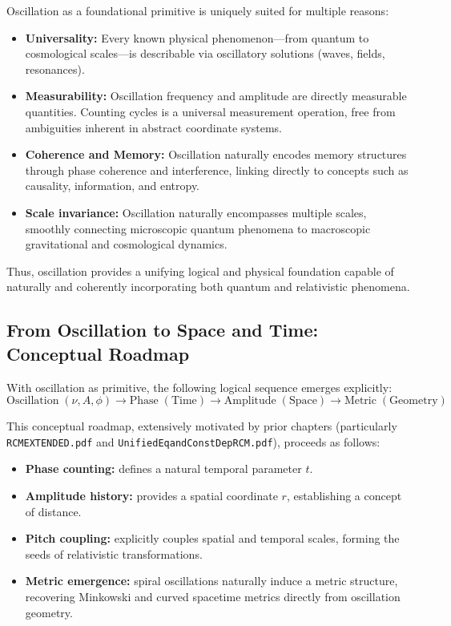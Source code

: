 Oscillation as a foundational primitive is uniquely suited for multiple reasons:
\begin{itemize}
    \item \textbf{Universality:} Every known physical phenomenon—from quantum to cosmological scales—is describable via oscillatory solutions (waves, fields, resonances).
    \item \textbf{Measurability:} Oscillation frequency and amplitude are directly measurable quantities. Counting cycles is a universal measurement operation, free from ambiguities inherent in abstract coordinate systems.
    \item \textbf{Coherence and Memory:} Oscillation naturally encodes memory structures through phase coherence and interference, linking directly to concepts such as causality, information, and entropy.
    \item \textbf{Scale invariance:} Oscillation naturally encompasses multiple scales, smoothly connecting microscopic quantum phenomena to macroscopic gravitational and cosmological dynamics.
\end{itemize}

Thus, oscillation provides a unifying logical and physical foundation capable of naturally and coherently incorporating both quantum and relativistic phenomena.

\subsection{From Oscillation to Space and Time: Conceptual Roadmap}

With oscillation as primitive, the following logical sequence emerges explicitly:
\begin{equation}
    \text{Oscillation}\;(\nu,A,\phi)\rightarrow
    \text{Phase}\;(\text{Time})\rightarrow
    \text{Amplitude}\;(\text{Space})\rightarrow
    \text{Metric}\;(\text{Geometry})
\end{equation}

This conceptual roadmap, extensively motivated by prior chapters (particularly \texttt{RCMEXTENDED.pdf} and \texttt{UnifiedEqandConstDepRCM.pdf}), proceeds as follows:
\begin{itemize}
    \item \textbf{Phase counting:} defines a natural temporal parameter \(t\).
    \item \textbf{Amplitude history:} provides a spatial coordinate \(r\), establishing a concept of distance.
    \item \textbf{Pitch coupling:} explicitly couples spatial and temporal scales, forming the seeds of relativistic transformations.
    \item \textbf{Metric emergence:} spiral oscillations naturally induce a metric structure, recovering Minkowski and curved spacetime metrics directly from oscillation geometry.
\end{itemize}

